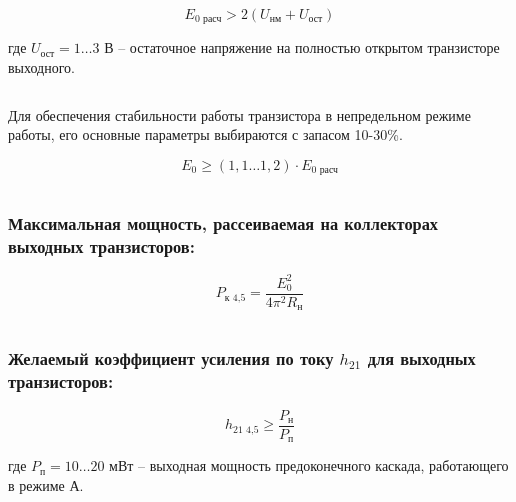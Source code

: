 \begin{equation}
\label{eq:equation2_3}
 E_{\text{0 расч}} > 2 (U_{\text{нм}} + U_{\text{ост}})
\end{equation}

\noindent где $ U_{\text{ост}} = 1 \ldots 3 $ В -- остаточное напряжение на полностью открытом транзисторе выходного.\par	

\begin{equation*}
  
\end{equation*}

     Для обеспечения стабильности работы транзистора в непредельном режиме работы, его основные параметры выбираются с запасом 10-30\%.

\begin{equation}
\label{eq:equation2_4}
 E_{\text{0}} \geq (1,1 \ldots 1,2) \cdot E_{\text{0 расч}}
\end{equation}

\begin{equation*}
 
\end{equation*}

\subsubsection{Максимальная мощность, рассеиваемая на коллекторах выходных транзисторов:}

\begin{equation}
\label{eq:equation2_5}
 P_{\text{к 4,5}} = \dfrac{E_0^2}{4 \pi^2 R_{\text{н}}}
\end{equation}

\begin{equation*}
 
\end{equation*}

\subsubsection{Желаемый коэффициент усиления по току $h_{21}$ для выходных транзисторов:}

\begin{equation}
\label{eq:equation2_6}
 h_{\text{21 4,5}} \geq \dfrac{P_{\text{н}}}{P_{\text{п}}}
\end{equation}

\noindent где $ P_{\text{п}} = 10 \ldots 20 $ мВт -- выходная мощность предоконечного каскада, работающего в режиме А.\par	

